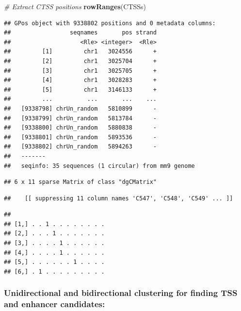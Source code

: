 \documentclass[9pt,a4paper,]{extarticle}
\newenvironment{Shaded}{\begin{snugshade}}{\end{snugshade}}
\newcommand{\KeywordTok}[1]{\textcolor[rgb]{0.13,0.29,0.53}{\textbf{{#1}}}}
\newcommand{\StringTok}[1]{\textcolor[rgb]{0.31,0.60,0.02}{{#1}}}
\newcommand{\CommentTok}[1]{\textcolor[rgb]{0.56,0.35,0.01}{\textit{{#1}}}}
\newcommand{\NormalTok}[1]{{#1}}
\begin{document}
\begin{Shaded}
\begin{Highlighting}[]
\CommentTok{# Extract CTSS positions}
\KeywordTok{rowRanges}\NormalTok{(CTSSs)}
\end{Highlighting}
\end{Shaded}

\begin{verbatim}
## GPos object with 9338802 positions and 0 metadata columns:
##                 seqnames       pos strand
##                    <Rle> <integer>  <Rle>
##         [1]         chr1   3024556      +
##         [2]         chr1   3025704      +
##         [3]         chr1   3025705      +
##         [4]         chr1   3028283      +
##         [5]         chr1   3146133      +
##         ...          ...       ...    ...
##   [9338798] chrUn_random   5810899      -
##   [9338799] chrUn_random   5813784      -
##   [9338800] chrUn_random   5880838      -
##   [9338801] chrUn_random   5893536      -
##   [9338802] chrUn_random   5894263      -
##   -------
##   seqinfo: 35 sequences (1 circular) from mm9 genome
\end{verbatim}

\begin{Shaded}
\end{Shaded}

\begin{verbatim}
## 6 x 11 sparse Matrix of class "dgCMatrix"
\end{verbatim}

\begin{verbatim}
##    [[ suppressing 11 column names 'C547', 'C548', 'C549' ... ]]
\end{verbatim}

\begin{verbatim}
##                           
## [1,] . . 1 . . . . . . . .
## [2,] . . . 1 . . . . . . .
## [3,] . . . . 1 . . . . . .
## [4,] . . . . 1 . . . . . .
## [5,] . . . . . . 1 . . . .
## [6,] . 1 . . . . . . . . .
\end{verbatim}

\subsubsection{Unidirectional and bidirectional clustering for finding TSS and enhancer candidates:}\label{unidirectional-and-bidirectional-clustering-for-finding-tss-and-enhancer-candidates}
\end{document}
